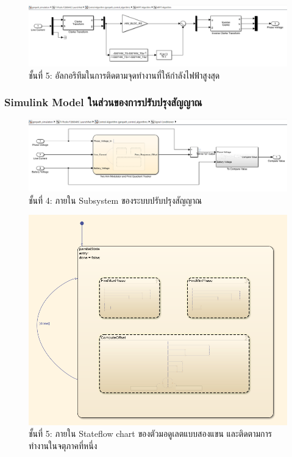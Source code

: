 \documentclass[11pt,a4paper]{article}
\begin{document}
\begin{figure}[H]
    \centering
    \includegraphics[width=\textwidth]{l5-mppt.png}
    \caption{ชั้นที่ 5: อัลกอริทึมในการติดตามจุดทำงานที่ให้กำลังไฟฟ้าสูงสุด}
\end{figure}

\subsubsection{Simulink Model ในส่วนของการปรับปรุงสัญญาณ}

\begin{figure}[H]
    \centering
    \includegraphics[width=\textwidth]{l4-sig-cond.png}
    \caption{ชั้นที่ 4: ภายใน Subsystem ของระบบปรับปรุงสัญญาณ}
\end{figure}

\begin{figure}[H]
    \centering
    \includegraphics[width=\textwidth]{tam-fqt-l1.png}
    \caption{ชั้นที่ 5: ภายใน Stateflow chart ของตัวมอดูเลตแบบสองแขน และติดตามการทำงานในจตุภาคที่หนึ่ง}
\end{figure}
\end{document}
